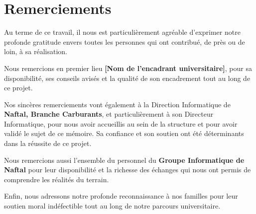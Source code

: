 \chapter*{Remerciements}

Au terme de ce travail, il nous est particulièrement agréable d'exprimer notre profonde
gratitude envers toutes les personnes qui ont contribué, de près ou de loin, à sa réalisation.

Nous remercions en premier lieu \textbf{[Nom de l'encadrant universitaire]}, pour sa
disponibilité, ses conseils avisés et la qualité de son encadrement tout au long de ce projet.

Nos sincères remerciements vont également à la Direction Informatique de \textbf{Naftal,
Branche Carburants}, et particulièrement à son Directeur Informatique, pour nous avoir
accueillis au sein de la structure et pour avoir validé le sujet de ce mémoire. Sa confiance
et son soutien ont été déterminants dans la réussite de ce projet.

Nous remercions aussi l'ensemble du personnel du \textbf{Groupe Informatique de Naftal}
pour leur disponibilité et la richesse des échanges qui nous ont permis de comprendre les
réalités du terrain.

Enfin, nous adressons notre profonde reconnaissance à nos familles pour leur soutien
moral indéfectible tout au long de notre parcours universitaire.
